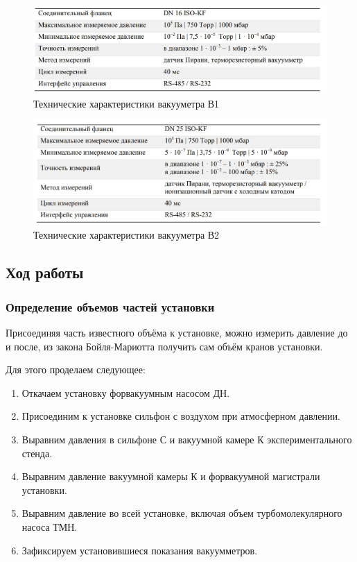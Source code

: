 \documentclass[12pt,a4paper]{article}
\begin{document}
\begin{figure}[H]
	\caption{Технические характеристики вакууметра В1}
	\label{fig:B1}
	\centering
	\includegraphics[width = 12 cm]{res/B1технические}
\end{figure}
\begin{figure}[H]
	\caption{Технические характеристики вакууметра В2}
	\label{fig:B2}
	\centering
	\includegraphics[width = 12 cm]{res/B2технические}
\end{figure}

\subsection*{Ход работы}

\subsubsection*{Определение объемов частей установки}
Присоединяя часть известного объёма к установке, можно измерить давление до и после, из закона Бойля-Мариотта получить сам объём кранов установки.

Для этого проделаем следующее:
\begin{enumerate}
	\item Откачаем установку форвакуумным насосом ДН.
	\item Присоединим к установке сильфон с воздухом при атмосферном давлении.
	\item Выравним давления в сильфоне С и вакуумной камере К экспериментального стенда.
	\item Выравним давление вакуумной камеры К и форвакуумной магистрали установки.
	\item Выравним давление во всей установке, включая объем турбомолекулярного насоса ТМН.
	\item Зафиксируем установившиеся показания вакуумметров.
	
\end{enumerate}
\end{document}

